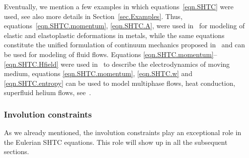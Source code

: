 \documentclass[twoside]{article}
\newcommand{\IP}[1]{ \textcolor{blue}   {\small\texttt{
\texttt{[image: pin\_small.jpeg]} Ilya: #1}} }
\newcommand{\MP}[1]{ \textcolor{Green}   {\small\texttt{
\texttt{[image: pin\_small.jpeg]} Michal: #1}} }
\begin{document}
Eventually, we mention a few examples in which equations~\eqref{eqn.SHTC} were 
used, see also more details in Section~\ref{sec.Examples}. Thus, 
equations~\eqref{eqn.SHTC.momentum}, \eqref{eqn.SHTC.A}, 
were used 
in~\cite{God1972,Rom1989,GodRom2003,BartonRom2010,Favrie2011,Barton2013,Boscheri2016} for modeling of elastic and elastoplastic deformations in metals, 
while the same equations constitute the unified formulation of continuum 
mechanics proposed in~\cite{HPR2016,DPRZ2016,HYP2016,DPRZ2017} and can be used 
for modeling of fluid flows. Equations 
\eqref{eqn.SHTC.momentum}--\eqref{eqn.SHTC.Hfield} were used 
in~\cite{Rom1998,DPRZ2017} 
to describe the electrodynamics of moving medium, equations 
\eqref{eqn.SHTC.momentum}, \eqref{eqn.SHTC.w} and \eqref{eqn.SHTC.entropy} can 
be used to model multiphase flows, heat conduction, superfluid helium flows,  
see~\cite{Rom1998,RomToro2007,RomDrikToro2010,Romenski2016}.


\begin{comment}
\paragraph{ADER equation}

\MP{TODO: Could you please include Eqs. (71) from the ADER paper with a 
short comment? The equations are necessary to make full comparison with GENERIC 
in the case of the electromagnetic field.}

\IP{Sure, but could you tell me for this the precise meaning of the letters $ e 
$, $ m $ and $ z $ in \eqref{eqn.divD.GENERIC}. Thanks}
\end{comment}

\subsubsection{Involution constraints}\label{sec.inv.constr}



As we already mentioned, the involution constraints play an exceptional role in 
the Eulerian SHTC equations. This role will show up in all the subsequent 
sections. 
\end{document}

